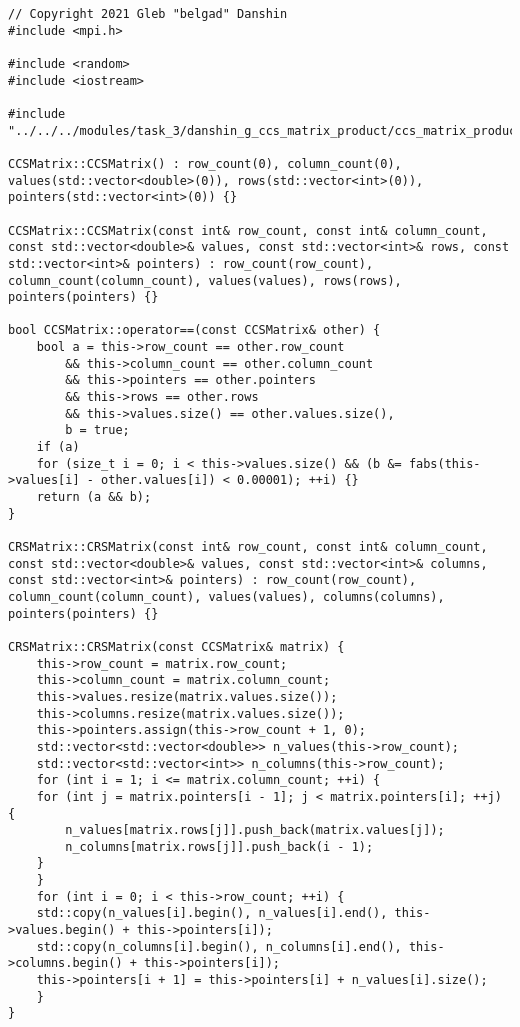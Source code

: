 \documentclass{report}
\begin{document}
\begin{lstlisting}
// Copyright 2021 Gleb "belgad" Danshin
#include <mpi.h>

#include <random>
#include <iostream>

#include "../../../modules/task_3/danshin_g_ccs_matrix_product/ccs_matrix_product.hh"

CCSMatrix::CCSMatrix() : row_count(0), column_count(0), values(std::vector<double>(0)), rows(std::vector<int>(0)), pointers(std::vector<int>(0)) {}

CCSMatrix::CCSMatrix(const int& row_count, const int& column_count, const std::vector<double>& values, const std::vector<int>& rows, const std::vector<int>& pointers) : row_count(row_count), column_count(column_count), values(values), rows(rows), pointers(pointers) {}

bool CCSMatrix::operator==(const CCSMatrix& other) {
    bool a = this->row_count == other.row_count
        && this->column_count == other.column_count
        && this->pointers == other.pointers
        && this->rows == other.rows
        && this->values.size() == other.values.size(),
        b = true;
    if (a)
    for (size_t i = 0; i < this->values.size() && (b &= fabs(this->values[i] - other.values[i]) < 0.00001); ++i) {}
    return (a && b);
}

CRSMatrix::CRSMatrix(const int& row_count, const int& column_count, const std::vector<double>& values, const std::vector<int>& columns, const std::vector<int>& pointers) : row_count(row_count), column_count(column_count), values(values), columns(columns), pointers(pointers) {}

CRSMatrix::CRSMatrix(const CCSMatrix& matrix) {
    this->row_count = matrix.row_count;
    this->column_count = matrix.column_count;
    this->values.resize(matrix.values.size());
    this->columns.resize(matrix.values.size());
    this->pointers.assign(this->row_count + 1, 0);
    std::vector<std::vector<double>> n_values(this->row_count);
    std::vector<std::vector<int>> n_columns(this->row_count);
    for (int i = 1; i <= matrix.column_count; ++i) {
    for (int j = matrix.pointers[i - 1]; j < matrix.pointers[i]; ++j) {
        n_values[matrix.rows[j]].push_back(matrix.values[j]);
        n_columns[matrix.rows[j]].push_back(i - 1);
    }
    }
    for (int i = 0; i < this->row_count; ++i) {
    std::copy(n_values[i].begin(), n_values[i].end(), this->values.begin() + this->pointers[i]);
    std::copy(n_columns[i].begin(), n_columns[i].end(), this->columns.begin() + this->pointers[i]);
    this->pointers[i + 1] = this->pointers[i] + n_values[i].size();
    }
}


\end{lstlisting}
\end{document}
